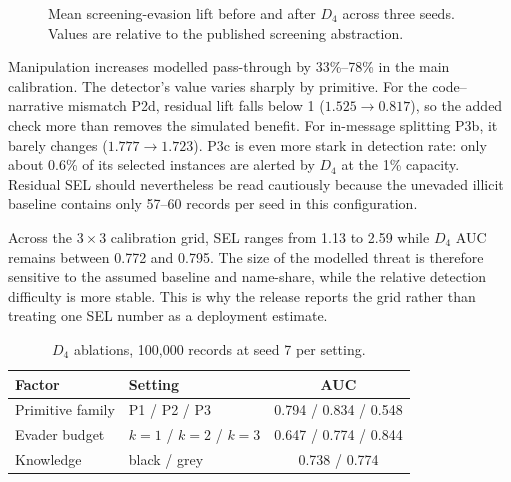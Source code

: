 \documentclass[conference]{IEEEtran}
\begin{document}
\begin{figure}[!t]
\centering
{}
\caption{Mean screening-evasion lift before and after $D_4$ across three
seeds. Values are relative to the published screening abstraction.}
\label{fig:sel}
\end{figure}

Manipulation increases modelled pass-through by 33\%--78\% in the main
calibration. The detector's value varies sharply by primitive. For the
code--narrative mismatch P2d, residual lift falls below 1
($1.525\rightarrow0.817$), so the added check more than removes the simulated
benefit. For in-message splitting P3b, it barely changes
($1.777\rightarrow1.723$). P3c is even more stark in detection rate: only about
0.6\% of its selected instances are alerted by $D_4$ at the 1\% capacity.
Residual SEL should nevertheless be read cautiously because the unevaded
illicit baseline contains only 57--60 records per seed in this configuration.

Across the $3\times3$ calibration grid, SEL ranges from 1.13 to 2.59 while
$D_4$ AUC remains between 0.772 and 0.795. The size of the modelled threat is
therefore sensitive to the assumed baseline and name-share, while the relative
detection difficulty is more stable. This is why the release reports the grid
rather than treating one SEL number as a deployment estimate.

\begin{table}[!t]
\caption{$D_4$ ablations, 100,000 records at seed 7 per setting.}
\label{tab:ablations}
\centering
\scriptsize
\begin{tabular}{@{}llc@{}}
\toprule
Factor & Setting & AUC \\
\midrule
Primitive family & P1 / P2 / P3 & 0.794 / 0.834 / 0.548 \\
Evader budget & $k=1$ / $k=2$ / $k=3$ & 0.647 / 0.774 / 0.844 \\
Knowledge & black / grey & 0.738 / 0.774 \\
\bottomrule
\end{tabular}
\end{table}
\end{document}

